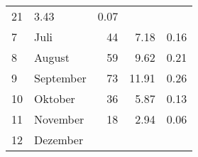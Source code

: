\begin{longtable}{lXrrr}
       \num{21} &
       \num[round-mode=places,round-precision=2]{3,43} &
         \num[round-mode=places,round-precision=2]{0,07} \\

     7 &
     \multicolumn{1}{X}{ Juli   } &


       \num{44} &
       \num[round-mode=places,round-precision=2]{7,18} &
         \num[round-mode=places,round-precision=2]{0,16} \\

     8 &
     \multicolumn{1}{X}{ August   } &


       \num{59} &
       \num[round-mode=places,round-precision=2]{9,62} &
         \num[round-mode=places,round-precision=2]{0,21} \\

     9 &
     \multicolumn{1}{X}{ September   } &


       \num{73} &
       \num[round-mode=places,round-precision=2]{11,91} &
         \num[round-mode=places,round-precision=2]{0,26} \\

     10 &
     \multicolumn{1}{X}{ Oktober   } &


       \num{36} &
       \num[round-mode=places,round-precision=2]{5,87} &
         \num[round-mode=places,round-precision=2]{0,13} \\

     11 &
     \multicolumn{1}{X}{ November   } &


       \num{18} &
       \num[round-mode=places,round-precision=2]{2,94} &
         \num[round-mode=places,round-precision=2]{0,06} \\

     12 &
     \multicolumn{1}{X}{ Dezember   } &



\end{longtable}
